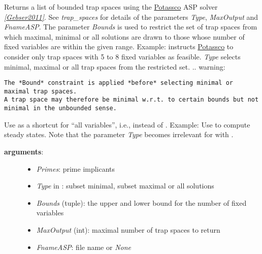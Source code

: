 \documentclass[letterpaper,10pt,english]{sphinxmanual}
\begin{document}
\begin{fulllineitems}
\label{TrapSpaces:PyBoolNet.TrapSpaces.trap_spaces_bounded}
Returns a list of bounded trap spaces using the \href{http://potassco.sourceforge.net/}{Potassco} ASP solver {\hyperref[Bibliography:gebser2011]{\emph{{[}Gebser2011{]}}}}.
See \emph{trap\_spaces} for details of the parameters \emph{Type}, \emph{MaxOutput} and \emph{FnameASP}.
The parameter \emph{Bounds} is used to restrict the set of trap spaces from which maximal, minimal or all solutions are drawn
to those whose number of fixed variables are within the given range.
Example:  instructs \href{http://potassco.sourceforge.net/}{Potassco} to consider only trap spaces with 5 to 8 fixed variables as feasible.
\emph{Type} selects minimal, maximal or all trap spaces from the restricted set.
.. warning:

\begin{Verbatim}[commandchars=\\\{\}]
The *Bound* constraint is applied *before* selecting minimal or maximal trap spaces.
A trap space may therefore be minimal w.r.t. to certain bounds but not minimal in the unbounded sense.
\end{Verbatim}

Use  as a shortcut for ``all variables'', i.e., instead of .
Example: Use  to compute steady states.
Note that the parameter \emph{Type} becomes irrelevant for  with .
\begin{description}
\item[{\textbf{arguments}:}] \leavevmode\begin{itemize}
\item {} 
\emph{Primes}: prime implicants

\item {} 
\emph{Type} in : subset minimal, subset maximal or all solutions

\item {} 
\emph{Bounds} (tuple): the upper and lower bound for the number of fixed variables

\item {} 
\emph{MaxOutput} (int): maximal number of trap spaces to return

\item {} 
\emph{FnameASP}: file name or \emph{None}


\end{itemize}
\end{description}
\end{fulllineitems}
\end{document}
